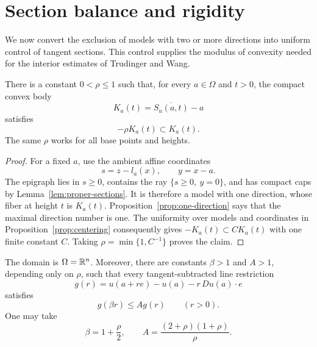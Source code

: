 \section{Section balance and rigidity}\label{sec:rigidity}

We now convert the exclusion of models with two or more directions into
uniform control of tangent sections.  This control supplies the modulus
of convexity needed for the interior estimates of Trudinger and Wang.

\begin{lemma}\label{lem:uniform-balance}
There is a constant \(0<\rho\le1\) such that, for every
\(a\in\Omega\) and \(t>0\), the compact convex body
\[
 K_a(t)=\overline{S_u(a,t)}-a
\]
satisfies
\begin{equation}\label{eq:uniform-section-balance}
 -\rho K_a(t)\subset K_a(t).
\end{equation}
The same \(\rho\) works for all base points and heights.
\end{lemma}

\begin{proof}
For a fixed \(a\), use the ambient affine coordinates
\[
 s=z-l_a(x),\qquad y=x-a.
\]
The epigraph lies in \(s\ge0\), contains the ray
\(\{s\ge0,\ y=0\}\), and has compact caps by
Lemma~\ref{lem:proper-sections}.  It is therefore a model with one
direction, whose fiber at height \(t\) is \(K_a(t)\).
Proposition~\ref{prop:one-direction} says that the maximal direction
number is one.  The uniformity over models and coordinates in
Proposition~\ref{prop:centering} consequently gives
\(-K_a(t)\subset C K_a(t)\) with one finite constant \(C\).
Taking \(\rho=\min\{1,C^{-1}\}\) proves the claim.
\end{proof}

\begin{lemma}\label{lem:doubling-entire}
The domain is \(\Omega=\mathbb R^n\).  Moreover, there are constants
\(\beta>1\) and \(A>1\), depending only on \(\rho\), such that every
tangent-subtracted line restriction
\[
 g(r)=u(a+re)-u(a)-r\,Du(a)\cdot e
\]
satisfies
\begin{equation}\label{eq:gap-doubling}
 g(\beta r)\le A g(r)\qquad(r>0).
\end{equation}
One may take
\begin{equation}\label{eq:doubling-constants}
 \beta=1+\frac{\rho}{2},\qquad
 A=\frac{(2+\rho)(1+\rho)}{\rho}.
\end{equation}
\end{lemma}

